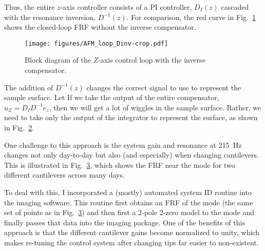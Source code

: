 \documentclass[11pt]{article}
\begin{document}
\begin{figure}[b!]
  \centering
  
  \caption{}
  \label{fig:z_control}
\end{figure}
Thus, the entire $z$-axis controller consists of a PI controller, $D_I(z)$ cascaded with the resonance inversion, $D^{-1}(z)$. For comparison, the red curve in Fig.~\ref{fig:z_control} shows the closed-loop FRF without the inverse compensator.
\begin{figure}
  \centering
  \texttt{[image: figures/AFM\_loop\_Dinv-crop.pdf]}
  \caption{Block diagram of the $Z$-axis control loop with the inverse compensator.}
  \label{fig:afm_bd_dinv}
\end{figure}
The addition of $D^{-1}(z)$ changes the correct signal to use to represent the sample surface. Let 
If we take the output of the entire compensator, $u_Z=D_ID^{-1}e_z$, then we will get a lot of wiggles in the sample surface. Rather, we need to take only the output of the integrator to represent the surface, as shown in Fig.~\ref{fig:afm_bd_dinv}.


One challenge to this approach is the system gain and resonance at 215~Hz changes not only day-to-day but also (and especially) when changing cantilevers. This is illustrated in Fig.~\ref{fig:z_evolution}, which shows the FRF near the mode for two different cantilevers across many days.

\begin{figure}
  \centering
  
  \caption{}
  \label{fig:z_evolution}
\end{figure}
To deal with this, I incorporated a (mostly) automated system ID routine into the imaging software. This routine first obtains an FRF of the mode (the same set of points as in Fig.~\ref{fig:z_evolution}) and then first a 2-pole 2-zero model to the mode and finally passes that data into the imaging package. One of the benefits of this approach is that the different cantilever gains become normalized to unity, which makes re-tuning the control system after changing tips far easier to non-existent.
\end{document}
